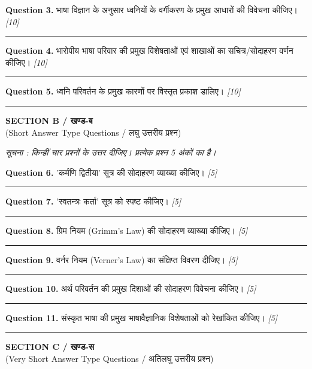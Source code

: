 \documentclass[11pt,a4paper]{article}
\newcommand{\pts}[1]{\hfill \textit{[#1]}}
\begin{document}
\noindent \textbf{Question 3.} भाषा विज्ञान के अनुसार ध्वनियों के वर्गीकरण के प्रमुख आधारों की विवेचना कीजिए। \pts{10}

\medskip\rule{\linewidth}{0.2pt}\medskip

\noindent \textbf{Question 4.} भारोपीय भाषा परिवार की प्रमुख विशेषताओं एवं शाखाओं का सचित्र/सोदाहरण वर्णन कीजिए। \pts{10}

\medskip\rule{\linewidth}{0.2pt}\medskip

\noindent \textbf{Question 5.} ध्वनि परिवर्तन के प्रमुख कारणों पर विस्तृत प्रकाश डालिए। \pts{10}

\bigskip
\rule{\linewidth}{0.2pt}
\bigskip

\begin{center}
  {\large\bfseries SECTION B / खण्ड-ब}\\[2pt]
  {\normalsize (Short Answer Type Questions / लघु उत्तरीय प्रश्न)}
\end{center}

\noindent \textit{सूचना : किन्हीं चार प्रश्नों के उत्तर दीजिए। प्रत्येक प्रश्न 5 अंकों का है।}\\[2pt]

\bigskip

\noindent \textbf{Question 6.} 'कर्मणि द्वितीया' सूत्र की सोदाहरण व्याख्या कीजिए। \pts{5}

\medskip\rule{\linewidth}{0.2pt}\medskip

\noindent \textbf{Question 7.} 'स्वतन्त्रः कर्ता' सूत्र को स्पष्ट कीजिए। \pts{5}

\medskip\rule{\linewidth}{0.2pt}\medskip

\noindent \textbf{Question 8.} ग्रिम नियम (Grimm's Law) की सोदाहरण व्याख्या कीजिए। \pts{5}

\medskip\rule{\linewidth}{0.2pt}\medskip

\noindent \textbf{Question 9.} वर्नर नियम (Verner's Law) का संक्षिप्त विवरण दीजिए। \pts{5}

\medskip\rule{\linewidth}{0.2pt}\medskip

\noindent \textbf{Question 10.} अर्थ परिवर्तन की प्रमुख दिशाओं की सोदाहरण विवेचना कीजिए। \pts{5}

\medskip\rule{\linewidth}{0.2pt}\medskip

\noindent \textbf{Question 11.} संस्कृत भाषा की प्रमुख भाषावैज्ञानिक विशेषताओं को रेखांकित कीजिए। \pts{5}

\bigskip
\rule{\linewidth}{0.2pt}
\bigskip

\begin{center}
  {\large\bfseries SECTION C / खण्ड-स}\\[2pt]
  {\normalsize (Very Short Answer Type Questions / अतिलघु उत्तरीय प्रश्न)}
\end{center}
\end{document}

